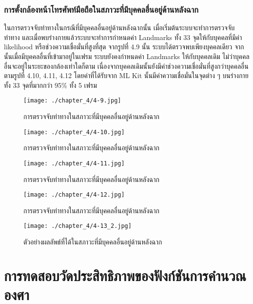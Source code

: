 \subsubsection{การตั้งกล้องหน้าโทรศัพท์มือถือในสภาวะที่มีบุคคลอื่นอยู่ด้านหลังฉาก}
ในการตรวจจับท่าทางในกรณีที่มีบุคคลอื่นอยู่ด้านหลังฉากนั้น เมื่อเริ่มต้นระบบจะทำการตรวจจับท่าทาง และเมื่อพบร่างกายแล้วระบบจะทำการกำหนดค่า Landmarks ทั้ง 33 จุดให้กับบุคคลที่มีค่า likelihood หรือช่วงความเชื่อมั่นที่สูงที่สุด จากรูปที่ 4.9 นั้น ระบบได้ตรวจพบเพียงบุคคลเดียว จากนั้นเมื่อมีบุคคลอื่นที่เข้ามาอยู่ในเฟรม ระบบยังคงกำหนดค่า Landmarks ให้กับบุคคลเดิม ไม่ว่าบุคคลอื่นจะอยู่ในระยะของกล้องเท่าใดก็ตาม เนื่องจากบุคคลเดิมนั้นยังมีค่าช่วงความเชื่อมั่นที่สูงกว่าบุคคลอื่น ตามรูปที่ 4.10, 4.11, 4.12 โดยค่าที่ได้รับจาก ML Kit นั้นมีค่าความเชื่อมั่นในจุดต่าง ๆ บนร่างกายทั้ง 33 จุดที่มากกว่า 95\% ทั้ง 5 เฟรม
\begin{figure}
	\texttt{[image: ./chapter\_4/4-9.jpg]}
	\caption{การตรวจจับท่าทางในสภาวะที่มีบุคคลอื่นอยู่ด้านหลังฉาก}
\end{figure}
\begin{figure}
	\texttt{[image: ./chapter\_4/4-10.jpg]}
	\caption{การตรวจจับท่าทางในสภาวะที่มีบุคคลอื่นอยู่ด้านหลังฉาก}
\end{figure}
\begin{figure}
	\texttt{[image: ./chapter\_4/4-11.jpg]}
	\caption{การตรวจจับท่าทางในสภาวะที่มีบุคคลอื่นอยู่ด้านหลังฉาก}
\end{figure}
\begin{figure}
	\texttt{[image: ./chapter\_4/4-12.jpg]}
	\caption{การตรวจจับท่าทางในสภาวะที่มีบุคคลอื่นอยู่ด้านหลังฉาก}
\end{figure}
\begin{figure}
	\texttt{[image: ./chapter\_4/4-13\_2.jpg]}
	\caption{ตัวอย่างผลลัพธ์ที่ได้ในสภาวะที่มีบุคคลอื่นอยู่ด้านหลังฉาก}
\end{figure}

\section{การทดสอบวัดประสิทธิภาพของฟังก์ชันการคำนวณองศา}

